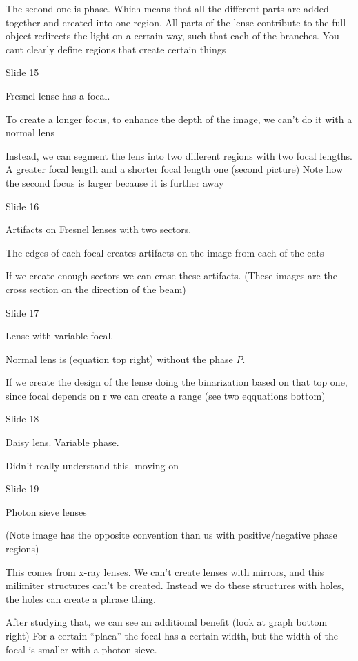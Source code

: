 \documentclass[../main/main.tex]{subfiles}
\begin{document}
The second one is phase. Which means that all the different parts are added together and created into one region. All parts of the lense contribute to the full object
redirects the light on a certain way, such that each of the branches. You cant clearly define regions that create certain things

Slide 15

Fresnel lense has a focal.

To create a longer focus, to enhance the depth of the image, we can't do it with a normal lens

Instead, we  can segment  the lens into two different regions with two focal lengths. A greater focal length and a shorter focal length one (second picture) Note how the second focus is larger because it is further away

Slide 16

Artifacts on Fresnel lenses with two sectors.

The edges of each focal creates artifacts on the image from each of the cats

If we create enough sectors we can erase these artifacts. (These images are the cross section on the direction of the beam)


Slide 17

Lense with variable focal.

Normal lens is (equation top right) without the phase $P$.

If we create the design of the lense doing the binarization based on that top one, since focal depends on r we can create a range (see two eqquations bottom)

Slide 18


Daisy lens. Variable phase.

Didn't really understand this. moving on

Slide 19

Photon sieve lenses

(Note image has the opposite convention than us with positive/negative phase regions)


This comes from x-ray lenses. We can't create lenses with mirrors, and this milimiter structures can't be created. Instead we do these structures with holes, the holes can create a phrase thing.

After studying that, we can see an additional benefit (look at graph bottom right) For a certain ``placa'' the focal has a certain width, but the width of the focal is smaller with a photon sieve.
\end{document}
